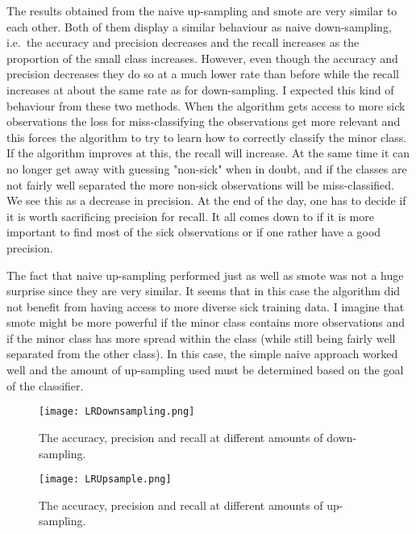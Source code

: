 \documentclass[11pt,twoside,swedish]{article}
\begin{document}
The results obtained from the naive up-sampling and smote are very
similar to each other. Both of them display a similar behaviour as
naive down-sampling, i.e.\ the accuracy and precision decreases and
the recall increases as the proportion of the small class
increases. However, even though the accuracy and precision decreases
they do so at a much lower rate than before while the recall increases
at about the same rate as for down-sampling. I expected this kind of
behaviour from these two methods. When the algorithm gets access to
more sick observations the loss for miss-classifying the observations
get more relevant and this forces the algorithm to try to learn how to
correctly classify the minor class. If the algorithm improves at this,
the recall will increase. At the same time it can no longer get away
with guessing "non-sick" when in doubt, and if the classes are not
fairly well separated the more non-sick observations will be
miss-classified. We see this as a decrease in precision. At the end of
the day, one has to decide if it is worth sacrificing precision for
recall. It all comes down to if it is more important to find most of
the sick observations or if one rather have a good precision.

The fact that naive up-sampling performed just as well as smote was
not a huge surprise since they are very similar. It seems that in this
case the algorithm did not benefit from having access to more diverse
sick training data. I imagine that smote might be more powerful if the
minor class contains more observations and if the minor class has more
spread within the class (while still being fairly well separated from
the other class). In this case, the simple naive approach worked well
and the amount of up-sampling used must be determined based on the
goal of the classifier. 

\graphicspath{{/home/mikael/Repos/Courses/msa220/Mini/Mini/Mini_3/}}
\begin{figure}[!htb]
\begin{center}
\texttt{[image: LRDownsampling.png]}
\caption{The accuracy, precision and recall at different amounts of down-sampling.}
\label{mini 3 down-sampling}
\end{center}
\end{figure}

\begin{figure}[!htb]
\begin{center}
\texttt{[image: LRUpsample.png]}
\caption{The accuracy, precision and recall at different amounts of up-sampling.}
\label{mini 3 up-sampling}
\end{center}
\end{figure}
\end{document}
